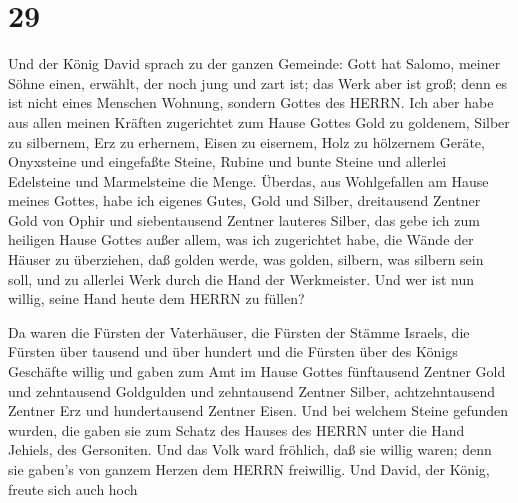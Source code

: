 \hypertarget{section-28}{%
\section{29}\label{section-28}}

 Und der König David sprach zu der ganzen Gemeinde: Gott hat
Salomo, meiner Söhne einen, erwählt, der noch jung und zart ist; das
Werk aber ist groß; denn es ist nicht eines Menschen Wohnung, sondern
Gottes des HERRN.  Ich aber habe aus allen meinen Kräften
zugerichtet zum Hause Gottes Gold zu goldenem, Silber zu silbernem, Erz
zu erhernem, Eisen zu eisernem, Holz zu hölzernem Geräte, Onyxsteine und
eingefaßte Steine, Rubine und bunte Steine und allerlei Edelsteine und
Marmelsteine die Menge.  Überdas, aus Wohlgefallen am Hause
meines Gottes, habe ich eigenes Gutes, Gold und Silber, 
dreitausend Zentner Gold von Ophir und siebentausend Zentner lauteres
Silber, das gebe ich zum heiligen Hause Gottes außer allem, was ich
zugerichtet habe, die Wände der Häuser zu überziehen,  daß
golden werde, was golden, silbern, was silbern sein soll, und zu
allerlei Werk durch die Hand der Werkmeister. Und wer ist nun willig,
seine Hand heute dem HERRN zu füllen?

 Da waren die Fürsten der Vaterhäuser, die Fürsten der
Stämme Israels, die Fürsten über tausend und über hundert und die
Fürsten über des Königs Geschäfte willig  und gaben zum Amt
im Hause Gottes fünftausend Zentner Gold und zehntausend Goldgulden und
zehntausend Zentner Silber, achtzehntausend Zentner Erz und
hundertausend Zentner Eisen.  Und bei welchem Steine
gefunden wurden, die gaben sie zum Schatz des Hauses des HERRN unter die
Hand Jehiels, des Gersoniten.  Und das Volk ward fröhlich,
daß sie willig waren; denn sie gaben's von ganzem Herzen dem HERRN
freiwillig. Und David, der König, freute sich auch hoch

